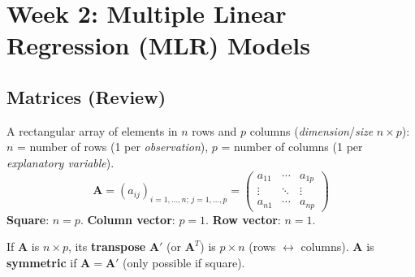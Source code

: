 
\section{Week 2: Multiple Linear Regression (MLR) Models}

\noindent{}

\subsection{Matrices (Review)}

\begin{definition}[Matrix]
    A rectangular array of elements in $n$ rows and $p$ columns
    (\emph{dimension}/\emph{size} $n\times p$): $n$ = number of rows (1
    per \emph{observation}), $p$ = number of columns (1 per
    \emph{explanatory variable}). 
    \[\mathbf{A} = (a_{ij})_{i=1,\dots,n;\,j=1,\dots,p}
    = \begin{pmatrix} a_{11} & \cdots & a_{1p} \\ \vdots & \ddots & \vdots \\ a_{n1} & \cdots & a_{np} \end{pmatrix}\]
    \textbf{Square}: $n=p$. \textbf{Column vector}: $p=1$.
    \textbf{Row vector}: $n=1$.
\end{definition}

\begin{definition}
    If $\mathbf{A}$ is $n\times p$, its \textbf{transpose} $\mathbf{A}'$
    (or $\mathbf{A}^T$) is $p\times n$ (rows $\leftrightarrow$
    columns). $\mathbf{A}$ is \textbf{symmetric} if $\mathbf{A}=\mathbf{A}'$
    (only possible if square).
\end{definition}

